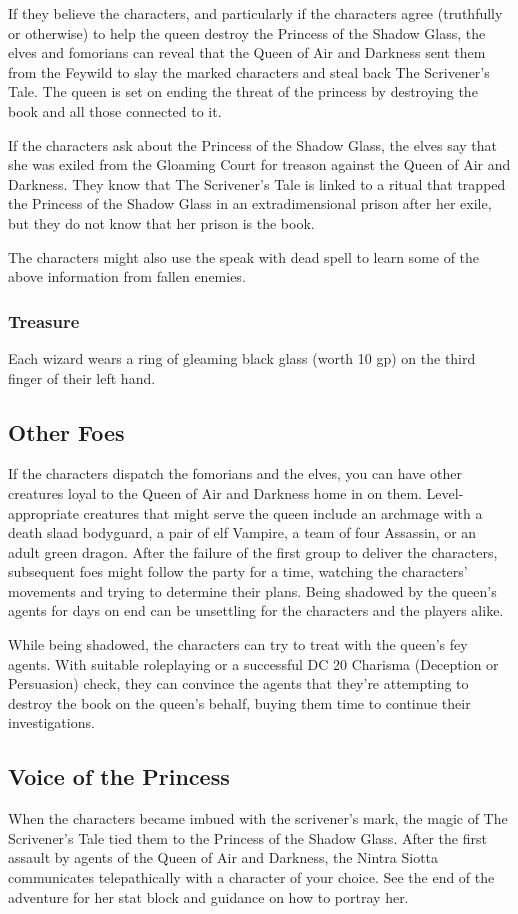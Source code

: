 \documentclass[10pt,a4paper,twoside,bg=print,twocolumn,openany,nodeprecatedcode]{dndbook}
\begin{document}
If they believe the characters, and particularly if the characters agree (truthfully or otherwise) to help the queen destroy the Princess of the Shadow Glass, the elves and fomorians can reveal that the Queen of Air and Darkness sent them from the Feywild to slay the marked characters and steal back The Scrivener's Tale. The queen is set on ending the threat of the princess by destroying the book and all those connected to it.

If the characters ask about the Princess of the Shadow Glass, the elves say that she was exiled from the Gloaming Court for treason against the Queen of Air and Darkness. They know that The Scrivener's Tale is linked to a ritual that trapped the Princess of the Shadow Glass in an extradimensional prison after her exile, but they do not know that her prison is the book.

The characters might also use the speak with dead spell to learn some of the above information from fallen enemies.

\subsubsection{Treasure}
Each wizard wears a ring of gleaming black glass (worth 10 gp) on the third finger of their left hand.

\subsection{Other Foes}
If the characters dispatch the fomorians and the elves, you can have other creatures loyal to the Queen of Air and Darkness home in on them. Level-appropriate creatures that might serve the queen include an archmage with a death slaad bodyguard, a pair of elf Vampire, a team of four Assassin, or an adult green dragon. After the failure of the first group to deliver the characters, subsequent foes might follow the party for a time, watching the characters' movements and trying to determine their plans. Being shadowed by the queen's agents for days on end can be unsettling for the characters and the players alike.

While being shadowed, the characters can try to treat with the queen's fey agents. With suitable roleplaying or a successful DC 20 Charisma (Deception or Persuasion) check, they can convince the agents that they're attempting to destroy the book on the queen's behalf, buying them time to continue their investigations.

\subsection{Voice of the Princess}
When the characters became imbued with the scrivener's mark, the magic of The Scrivener's Tale tied them to the Princess of the Shadow Glass. After the first assault by agents of the Queen of Air and Darkness, the Nintra Siotta communicates telepathically with a character of your choice. See the end of the adventure for her stat block and guidance on how to portray her.
\end{document}
